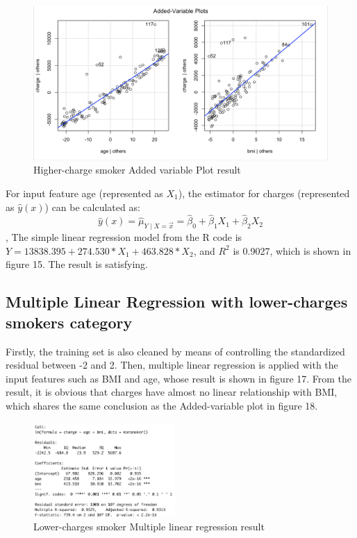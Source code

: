 \documentclass[12pt,a4paper]{article}
\begin{document}
\begin{figure}[H]
\centering
\includegraphics[width=1\textwidth]{avplot2.png}
\caption{Higher-charge smoker Added variable Plot result}
\end{figure}
For input feature age (represented as $X_1$), the estimator for charges (represented as $\widehat{y}(x)$) can be calculated as:
$$\widehat{y}(x)=\widehat{\mu}_{Y \mid X=\vec{x} }=\widehat{\beta}_{0}+\widehat{\beta}_{1} X_1+ \widehat{\beta}_{2} X_2$$,
The simple linear regression model from the R code is $Y = 13838.395 + 274.530 * X_1 + 463.828 * X_2$, and $R^{2}$ is  0.9027, which is shown in figure 15. The result is satisfying.
\subsection{Multiple Linear Regression with lower-charges smokers category}
Firstly, the training set is also cleaned by means of controlling the standardized residual between -2 and 2.
Then, multiple linear regression is applied with the input features such as BMI and age, whose result is shown in figure 17. From the result, it is obvious that charges have almost no linear relationship with BMI, which shares the same conclusion as the Added-variable plot in figure 18. 
\begin{figure}[H]
\centering
\includegraphics[width=0.48\textwidth]{mlm.jpg}
\caption{Lower-charges smoker Multiple linear regression result}
\end{figure}
\end{document}
